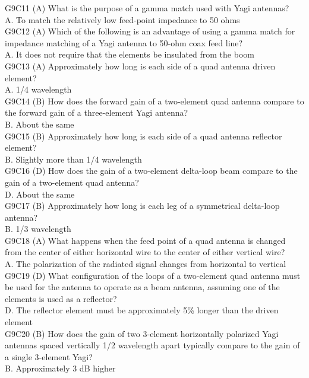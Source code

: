 \documentclass[12pt,letterpaper]{report}
\begin{document}
G9C11 (A) What is the purpose of a gamma match used with Yagi antennas?\\
A. To match the relatively low feed-point impedance to 50 ohms\\

G9C12 (A) Which of the following is an advantage of using a gamma match for impedance matching of a Yagi antenna to 50-ohm coax feed line?\\
A. It does not require that the elements be insulated from the boom\\

G9C13 (A) Approximately how long is each side of a quad antenna driven element?\\
A. 1/4 wavelength\\

G9C14 (B) How does the forward gain of a two-element quad antenna compare to the forward gain of a three-element Yagi antenna?\\
B. About the same\\

G9C15 (B) Approximately how long is each side of a quad antenna reflector element?\\
B. Slightly more than 1/4 wavelength\\

G9C16 (D) How does the gain of a two-element delta-loop beam compare to the gain of a two-element quad antenna?\\
D. About the same\\

G9C17 (B) Approximately how long is each leg of a symmetrical delta-loop antenna?\\
B. 1/3 wavelength\\

G9C18 (A) What happens when the feed point of a quad antenna is changed from the center of either horizontal wire to the center of either vertical wire?\\
A. The polarization of the radiated signal changes from horizontal to vertical\\

G9C19 (D) What configuration of the loops of a two-element quad antenna must be used for the antenna to operate as a beam antenna, assuming one of the elements is used as a reflector? \\
D. The reflector element must be approximately 5\% longer than the driven element\\

G9C20 (B) How does the gain of two 3-element horizontally polarized Yagi antennas spaced vertically 1/2 wavelength apart typically compare to the gain of a single 3-element Yagi?\\
B. Approximately 3 dB higher\\
\end{document}
